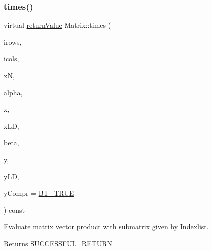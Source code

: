 \subsubsection{\texorpdfstring{times()}{times()}\hspace{0.1cm}{\footnotesize\ttfamily [2/2]}}
{\footnotesize\ttfamily virtual \hyperlink{_message_handling_8hpp_a81d556f613bfbabd0b1f9488c0fa865e}{return\+Value} Matrix\+::times (\begin{DoxyParamCaption}\item[{const \hyperlink{class_indexlist}{Indexlist} $\ast$const}]{irows,  }\item[{const \hyperlink{class_indexlist}{Indexlist} $\ast$const}]{icols,  }\item[{\hyperlink{_types_8hpp_ab6fd6105e64ed14a0c9281326f05e623}{int\+\_\+t}}]{xN,  }\item[{\hyperlink{qp_o_a_s_e_s__wrapper_8h_a0d00e2b3dfadee81331bbb39068570c4}{real\+\_\+t}}]{alpha,  }\item[{const \hyperlink{qp_o_a_s_e_s__wrapper_8h_a0d00e2b3dfadee81331bbb39068570c4}{real\+\_\+t} $\ast$}]{x,  }\item[{\hyperlink{_types_8hpp_ab6fd6105e64ed14a0c9281326f05e623}{int\+\_\+t}}]{x\+LD,  }\item[{\hyperlink{qp_o_a_s_e_s__wrapper_8h_a0d00e2b3dfadee81331bbb39068570c4}{real\+\_\+t}}]{beta,  }\item[{\hyperlink{qp_o_a_s_e_s__wrapper_8h_a0d00e2b3dfadee81331bbb39068570c4}{real\+\_\+t} $\ast$}]{y,  }\item[{\hyperlink{_types_8hpp_ab6fd6105e64ed14a0c9281326f05e623}{int\+\_\+t}}]{y\+LD,  }\item[{\hyperlink{_types_8hpp_a20f82124c82b6f5686a7fce454ef9089}{Boolean\+Type}}]{y\+Compr = {\ttfamily \hyperlink{_types_8hpp_a20f82124c82b6f5686a7fce454ef9089a34c57965bfb07125b09326a69019f9c6}{B\+T\+\_\+\+T\+R\+UE}} }\end{DoxyParamCaption}) const\hspace{0.3cm}{\ttfamily [pure virtual]}}

Evaluate matrix vector product with submatrix given by \hyperlink{class_indexlist}{Indexlist}. \begin{DoxyReturn}{Returns}
S\+U\+C\+C\+E\+S\+S\+F\+U\+L\+\_\+\+R\+E\+T\+U\+RN 
\end{DoxyReturn}

